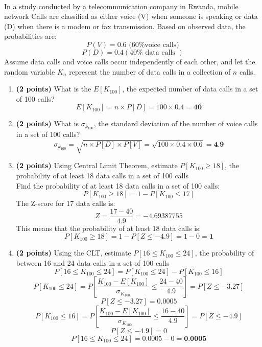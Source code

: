 \documentclass[a3paper,12pt]{extarticle} %
\begin{document}
    \\ In a study conducted by a telecommunication company in Rwanda, mobile network Calls are classified as either voice (V) when someone is speaking or data (D) when there is a modem or fax transmission. Based on observed data, the probabilities are:
    \[
    P(V) = 0.6 \text{ (60\% voice calls)}
    \]
    \[
    P(D) = 0.4 (40\% \text{ data calls })
    \]
    Assume data calls and voice calls occur independently of each other, and let the random variable \(K_n\) represent the number of data calls in a collection of \(n\) calls.
    \begin{enumerate}
        \item \textbf{(2 points)} What is the \(E[K_{100}]\), the expected number of data calls in a set of 100 calls?
        \[
        E[K_{100}] = n \times P[D] = 100 \times 0.4 = \textbf{40}
        \]
        \item \textbf{(2 points)} What is \(\sigma_{k_{100}}\), the standard deviation of the number of voice calls in a set of 100 calls?
        \[
        \sigma_{k_{100}} = \sqrt{n \times P[D] \times P[V]} = \sqrt{100 \times 0.4 \times 0.6} = \textbf{4.9}
        \]
        \item \textbf{(2 points)} Using Central Limit  Theorem, estimate \(P[K_{100} \geq  18]\), the probability of at least 18 data calls in a set of 100 calls
        \\ Find the probability of at least 18 data calls in a set of 100 calls:
        \[
        P[K_{100} \geq 18] = 1 - P[K_{100} \leq 17]
        \]
        The Z-score for 17 data calls is:
        \[
        Z = \frac{17 - 40}{4.9} = -4.69387755
        \]
        This means that the probability of at least 18 data calls is:
        \[
        P[K_{100} \geq 18] = 1 - P[Z \leq - 4.9] = 1 - 0 = \textbf{1}
        \]
        \item \textbf{(2 points)} Using the CLT, estimate \(P[16 \leq K_{100} \leq  24]\), the probability of between 16 and 24 data calls in a set of 100 calls
        \[
        P[16 \leq K_{100} \leq 24] = P[K_{100} \leq 24] - P[K_{100} \leq 16]
        \]
        \[
        P[K_{100} \leq 24] = P\left[\frac{K_{100} - E[K_{100}]}{\sigma_{K_{100}}} \leq \frac{24 - 40}{4.9}\right] = P[Z \leq -3.27]
        \]
        \[
        P[Z \leq -3.27] = 0.0005
        \]
        \[
        P[K_{100} \leq 16] = P\left[\frac{K_{100} - E[K_{100}]}{\sigma_{K_{100}}} \leq \frac{16 - 40}{4.9}\right] = P[Z \leq -4.9]
        \]
        \[
        P[Z \leq -4.9] = 0
        \]
        \[
        P[16 \leq K_{100} \leq 24] = 0.0005 - 0 = \textbf{0.0005}
\]
\end{enumerate}
\end{document}

